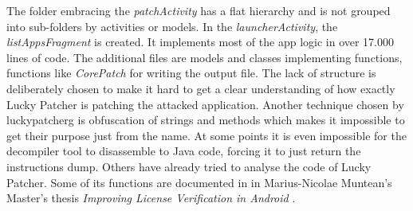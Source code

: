 The folder embracing the \textit{patchActivity} has a flat hierarchy and is not grouped into sub-folders by activities or models.
In the \textit{launcherActivity}, the \textit{listAppsFragment} is created.
It implements most of the app logic in over 17.000 lines of code.
The additional files are models and classes implementing functions, functions like \textit{CorePatch} for writing the output file.
The lack of structure is deliberately chosen to make it hard to get a clear understanding of how exactly Lucky Patcher is patching the attacked application.
Another technique chosen by \gls{luckypatcherg} is obfuscation of strings and methods which makes it impossible to get their purpose just from the name.
At some points it is even impossible for the decompiler tool to disassemble to Java code, forcing it to just return the instructions dump.
\newline
Others have already tried to analyse the code of Lucky Patcher.
Some of its functions are documented in in Marius-Nicolae Muntean's Master's thesis \textit{Improving License Verification in Android} \cite{munteanLicense}.
